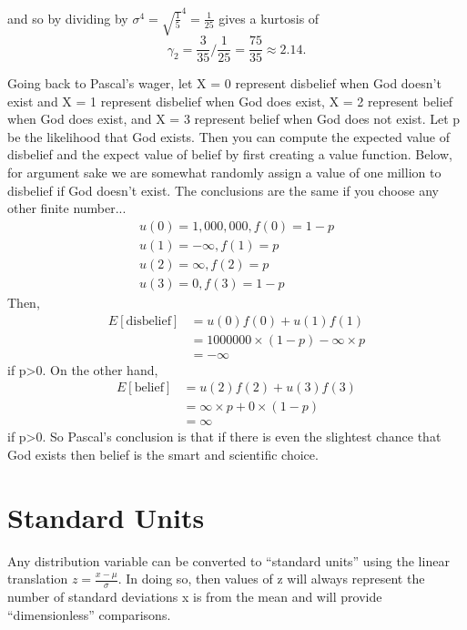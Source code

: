 \documentclass[10pt,]{book}
\theoremstyle{plain}
\theoremstyle{definition}
\theoremstyle{definition}
\theoremstyle{definition}
\numberwithin{equation}{section}
\begin{document}
	and so by dividing by \(\sigma^4 = \sqrt{\frac{1}{5}}^4 = \frac{1}{25}\) gives a kurtosis of
	\begin{equation*}\gamma_2 = \frac{3}{35} / \frac{1}{25} = \frac{75}{35} \approx 2.14.\end{equation*}
\par
Going back to Pascal's wager, let X = 0 represent disbelief when God doesn't exist and X = 1 represent disbelief when God does exist, X = 2 represent belief when God does exist, and X = 3 represent belief when God does not exist. Let p be the likelihood that God exists. Then you can compute the expected value of disbelief and the expect value of belief by first creating a value function. Below, for argument sake we are somewhat randomly assign a value of one million to disbelief if God doesn't exist. The conclusions are the same if you choose any other finite number...
	\begin{gather*}
u(0) = 1,000,000, f(0) = 1-p\\
u(1) = -\infty, f(1) = p\\
u(2) = \infty, f(2) = p\\
u(3) = 0, f(3) = 1-p
\end{gather*}
	Then, 
	\begin{align*}
E[\text{disbelief}] & = u(0)f(0) + u(1)f(1)\\
& = 1000000 \times (1-p) - \infty \times p\\
& = -\infty
\end{align*}
	if p>0. On the other hand, 
	\begin{align*}
E[\text{belief}] & = u(2)f(2) + u(3)f(3)\\
& = \infty \times p + 0 \times (1-p)\\
& = \infty
\end{align*}
	if p>0. So Pascal's conclusion is that if there is even the slightest chance that God exists then belief is the smart and scientific choice.
\typeout{************************************************}
\typeout{************************************************}
\section[{Standard Units}]{Standard Units}\label{section-25}
Any distribution variable can be converted to “standard units” using the linear translation 
	\(\displaystyle z = \frac{x-\mu}{\sigma}\). In doing so, then values of z will always represent the number of
	standard deviations x is from the mean and will provide “dimensionless” comparisons.%
\typeout{************************************************}
\typeout{************************************************}
\end{document}
